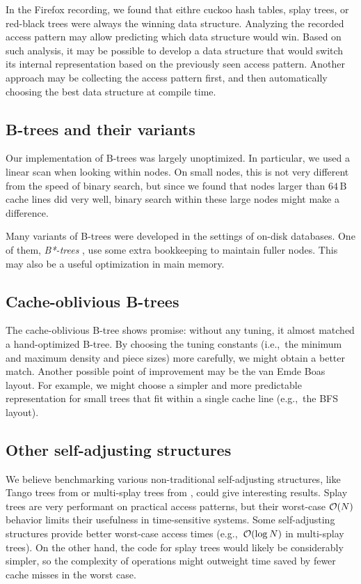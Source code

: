 In the Firefox recording, we found that eithre cuckoo hash tables, splay trees,
or red-black trees were always the winning data structure. Analyzing the
recorded access pattern may allow predicting which data structure would win.
Based on such analysis, it may be possible to develop a data structure that
would switch its internal representation based on the previously seen access
pattern. Another approach may be collecting the access pattern first, and
then automatically choosing the best data structure at compile time.

\subsection{B-trees and their variants}
Our implementation of \mbox{B-trees} was largely unoptimized. In particular,
we used a linear scan when looking within nodes. On small nodes, this is
not very different from the speed of binary search, but since we found
that nodes larger than $64\,\text{B}$ cache lines did very well, binary search
within these large nodes might make a difference.

Many variants of B-trees were developed in the settings of on-disk databases.
One of them, \emph{B*-trees} \cite{bstar}, use some extra bookkeeping to
maintain fuller nodes. This may also be a useful optimization in main memory.

\subsection{Cache-oblivious B-trees}
The cache-oblivious B-tree shows promise: without any tuning, it almost
matched a hand-optimized B-tree. By choosing the tuning constants (i.e.,\ the
minimum and maximum density and piece sizes) more carefully, we might obtain
a better match. Another possible point of improvement may be the van Emde Boas
layout. For example, we might choose a simpler and more predictable
representation for small trees that fit within a single cache line
(e.g.,\ the BFS layout).

\subsection{Other self-adjusting structures}
We believe benchmarking various non-traditional self-adjusting structures,
like Tango trees from \cite{tango} or multi-splay trees from
\cite{multisplay-trees}, could give interesting results. Splay trees are very
performant on practical access patterns, but their worst-case $\mathcal{O}(N)$ behavior
limits their usefulness in time-sensitive systems. Some self-adjusting
structures provide better worst-case access times (e.g.,\ $\mathcal{O}(\log N)$ in
multi-splay trees). On the other hand, the code for splay trees would
likely be considerably simpler, so the complexity of operations might outweight
time saved by fewer cache misses in the worst case.

